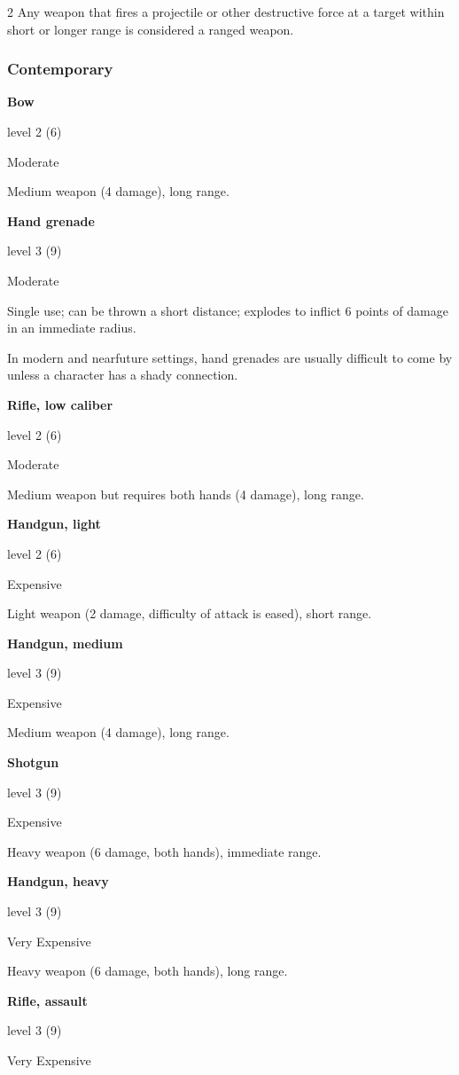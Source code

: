 \begin{multicols}{2}
Any weapon that fires a projectile or other destructive force at a target within short or longer range is considered a ranged weapon. 

\subsubsection{Contemporary}

\textbf{Bow} 

level 2 (6) 

Moderate 

Medium weapon (4 damage), long range. 

\textbf{Hand grenade} 

level 3 (9) 

Moderate 

Single use; can be thrown a short distance; explodes to inflict 6 points of damage in an immediate radius. 

In modern and nearfuture settings, hand grenades are usually difficult to come by unless a character has a shady connection.

\textbf{Rifle, low caliber} 

level 2 (6) 

Moderate 

Medium weapon but requires both hands (4 damage), long range. 

\textbf{Handgun, light} 

level 2 (6) 

Expensive 

Light weapon (2 damage, difficulty of attack is eased), short range. 

\textbf{Handgun, medium} 

level 3 (9) 

Expensive 

Medium weapon (4 damage), long range. 

\textbf{Shotgun}

level 3 (9) 

Expensive

Heavy weapon (6 damage, both hands), immediate range. 

\textbf{Handgun, heavy} 

level 3 (9)

Very Expensive 

Heavy weapon (6 damage, both hands), long range. 

\textbf{Rifle, assault} 

level 3 (9) 

Very Expensive 


\end{multicols}
